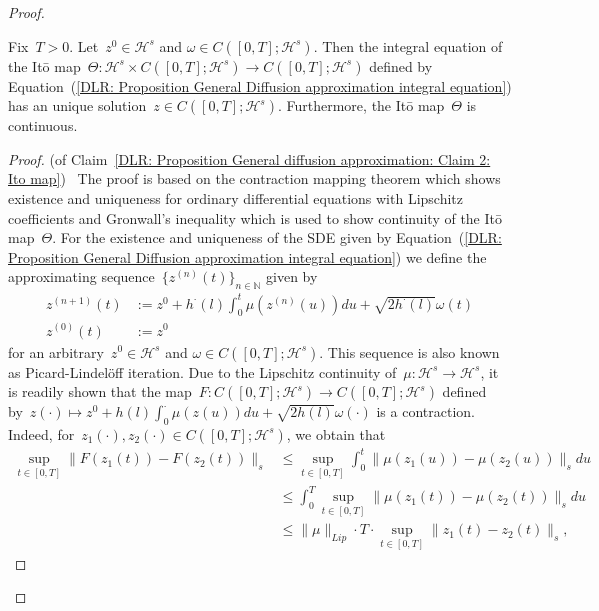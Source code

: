 \begin{proof}
  \begin{claim}
    \label{DLR: Proposition General diffusion approximation: Claim 2: Ito map}
  Fix~$T>0$. Let~$z^0 \in \mathcal{H}^s$ and $\omega \in C([0,T];\mathcal{H}^s)$. Then the integral equation of the It\={o} map~$\Theta : \mathcal{H}^s \times C([0,T]; \mathcal{H}^s) \to  C([0,T]; \mathcal{H}^s)$ defined by Equation~(\ref{DLR: Proposition General Diffusion approximation integral equation}) has an unique solution~$z \in C([0,T];\mathcal{H}^s)$. Furthermore, the It\={o} map~$\Theta$ is continuous.
  \end{claim}
  
  \begin{proof} (of Claim~\ref{DLR: Proposition General diffusion approximation: Claim 2: Ito map})~\autocite[Lemma 3.7]{Mattingly2010}
    The proof is based on the contraction mapping theorem which shows existence and uniqueness for ordinary differential equations with Lipschitz coefficients and Gronwall's inequality which is used to show continuity of the It\={o} map~$\Theta$. For the existence and uniqueness of the SDE given by Equation~(\ref{DLR: Proposition General Diffusion approximation integral equation}) we define the approximating sequence~$\{ z^{(n)}(t) \}_{n \in \mathbb{N}} $ given by
    \begin{equation}
      \begin{split}
       z^{(n+1)}(t) & := z^0 + h^{\cdot}(l) \int_0^t \mu (z^{(n)}(u)) du + \sqrt{2 h^{\cdot}(l)} \omega(t) \\
       z^{(0)}(t) & := z^0
      \end{split}
    \end{equation}
    for an arbitrary~$z^0 \in \mathcal{H}^s$ and $\omega \in C([0,T];\mathcal{H}^s)$. This sequence is also known as Picard-Lindel\"{o}ff iteration. Due to the Lipschitz continuity of~$\mu: \mathcal{H}^s \to \mathcal{H}^s$, it is readily shown that the map~$F: C([0,T];\mathcal{H}^s) \to C([0,T];\mathcal{H}^s)$ defined by~$z(\cdot) \mapsto z^0 + h(l) \int_0^{\cdot} \mu (z(u)) du + \sqrt{2 h(l)} \omega(\cdot)$ is a contraction. Indeed, for~$z_1(\cdot), z_2(\cdot) \in C([0,T];\mathcal{H}^s)$, we obtain that
    \begin{align*}
      \sup_{t \in [0,T]} \| F(z_1(t)) - F(z_2(t)) \|_{s} & \leq \sup_{t \in [0,T]} \int_0^t \| \mu(z_1(u)) - \mu(z_2(u)) \|_{s} du \\
      & \leq \int_0^T \sup_{t \in [0,T]} \| \mu(z_1(t)) - \mu(z_2(t)) \|_{s} du \\
      & \leq \| \mu \|_{Lip} \cdot T \cdot \sup_{t \in [0,T]} \| z_1(t) - z_2(t) \|_{s},

\end{align*}
\end{proof}
\end{proof}
